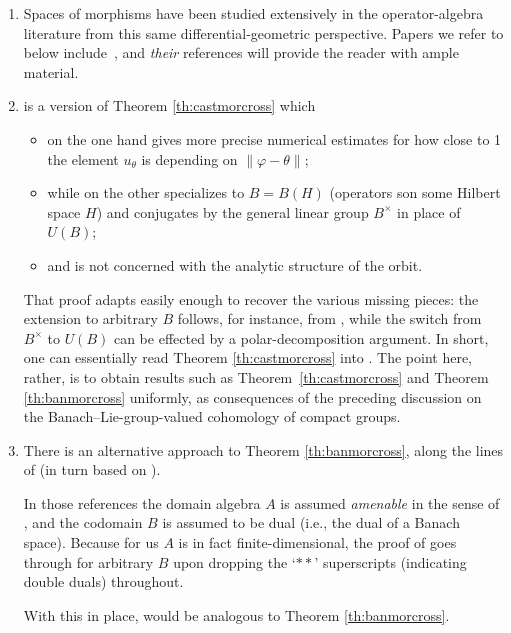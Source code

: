 \documentclass[pdftex]{sigma}
\numberwithin{equation}{section}
\begin{document}
\begin{Remarks}\label{res:wogen}\quad
 \begin{enumerate}[(1)]\itemsep=0pt
 \item Spaces of morphisms have been studied extensively in the operator-algebra literature from this same differential-geometric perspective. Papers we refer to below include~\cite{acs,cg-average,cg-amen}, and {\it their} references will provide the reader with ample material.
 \item\label{item:acs} \cite[Proposition 2.2]{acs} is a version of Theorem \ref{th:castmorcross} which
 \begin{itemize}\itemsep=0pt
 \item on the one hand gives more precise numerical estimates for how close to 1 the element $u_{\theta}$ is depending on $\|\varphi-\theta\|$;
 \item while on the other specializes to $B=B(H)$ (operators son some Hilbert space $H$) and conjugates by the general linear group $B^{\times}$ in place of $U(B)$;
 \item and is not concerned with the analytic structure of the orbit.
 \end{itemize}
 That proof adapts easily enough to recover the various missing pieces: the extension to arbitrary $B$ follows, for instance, from \cite[Remark~2.4]{acs}, while the switch from $B^{\times}$ to $U(B)$ can be effected by a polar-decomposition argument. In short, one can essentially read Theorem \ref{th:castmorcross} into \cite[Proposition 2.2]{acs}. The point here, rather, is to obtain results such as Theorem~\ref{th:castmorcross} and Theorem \ref{th:banmorcross} uniformly, as consequences of the preceding discussion on the Banach--Lie-group-valued cohomology of compact groups.

 \item There is an alternative approach to Theorem \ref{th:banmorcross}, along the lines of \cite[Proposition 8.2.2 and Theorem 8.2.3]{run-lec} (in turn based on \cite[Proposition 4.1 and Theorem 4.5]{cg-amen}).

 In those references the domain algebra $A$ is assumed {\it amenable} in the sense of \cite[Definition~2.1.9]{run-lec}, and the codomain $B$ is assumed to be dual (i.e., the dual of a Banach space). Because for us $A$ is in fact finite-dimensional, the proof of \cite[Theorem 8.2.1]{run-lec} goes through for arbitrary $B$ upon dropping the `$**$' superscripts (indicating double duals) throughout.

 With this in place, \cite[Proposition 8.2.2 and part of Proposition 8.2.3]{run-lec} would be analogous to Theorem \ref{th:banmorcross}.
 \end{enumerate}
\end{Remarks}
\end{document}
